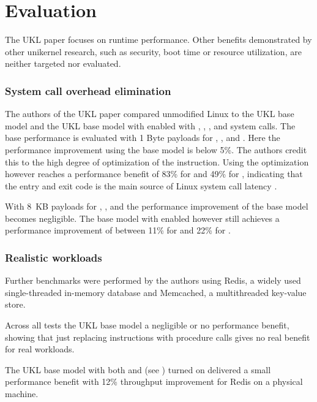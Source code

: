 \documentclass[10pt,twocolumn,a4paper]{article}
\begin{document}
\section{Evaluation}\label{sec:evaluation}
  The UKL paper focuses on runtime performance.
  Other benefits demonstrated by other unikernel research, such as security, boot time or
  resource utilization, are neither targeted nor evaluated.
  
  \subsubsection{System call overhead elimination}
    The authors of the UKL paper compared unmodified Linux to the UKL base model
    and the UKL base model with  enabled with , ,
    ,  and  system calls.
    The base performance is evaluated with 1 Byte payloads for ,
    ,  and .
    Here the performance improvement using the base model is below 5\%.
    The authors credit this to the high degree of optimization of the 
    instruction.
    Using the  optimization however reaches a performance benefit of
    83\% for  and 49\% for , indicating that the entry
    and exit code is the main source of Linux system call latency \cite{raza23}.

    With 8~KB payloads for , ,  and 
    the performance improvement of the base model becomes negligible. 
    The base model with  enabled however still achieves a performance 
    improvement of between 11\% for  and 22\% for .

  \subsubsection{Realistic workloads}
    Further benchmarks were performed by the authors using Redis, a widely used single-threaded 
    in-memory database and Memcached, a multithreaded key-value store.

    Across all tests the UKL base model a negligible or no performance benefit,
    showing that just replacing  instructions with procedure calls
    gives no real benefit for real workloads.

    The UKL base model with both  and 
    (see ) turned on delivered a small performance
    benefit with 12\% throughput improvement for Redis on a physical machine.
\end{document}

